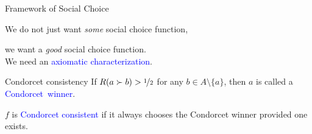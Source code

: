 \documentclass{beamer}
\theoremstyle{definition}
\def\b{\textcolor{blue}}
\def\g#1{{\usebeamercolor[fg]{block title example}{#1}}}
\begin{document}
\begin{frame}{Framework of Social Choice}
\begin{center}
We do not just want \emph{some} social choice function,\par
we want a \emph{good} social choice function.\pause \\[10pt]
We need an \b{axiomatic characterization}.
\end{center}\pause

\begin{block}{Condorcet consistency}
If $R(a \succ b) > \nicefrac{1}{2}$ for any $b \in A \setminus \{a\}$\pause, then $a$ is called a \b{Condorcet~winner}.\par\pause
$f$ is \b{Condorcet consistent} if it always chooses the Condorcet winner provided one exists.
\end{block}


\end{frame}
\end{document}
